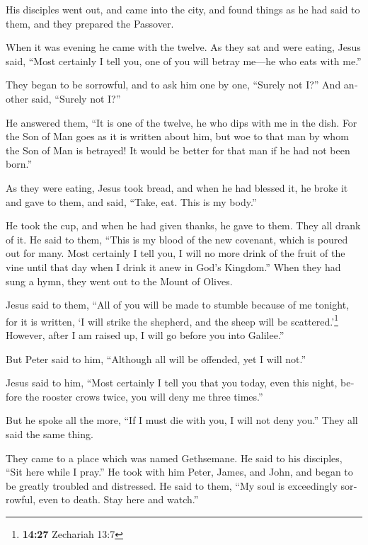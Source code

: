 \begin{paracol}{2}
\begin{otherlanguage}{english}
 His disciples went out, and came into the city, and
found things as he had said to them, and they prepared the Passover.

 When it was evening he came with the twelve.
 As they sat and were eating, Jesus said, ``Most
certainly I tell you, one of you will betray me---he who eats with me.''

 They began to be sorrowful, and to ask him one by one,
``Surely not I?'' And another said, ``Surely not I?''

 He answered them, ``It is one of the twelve, he who dips
with me in the dish.  For the Son of Man goes as it is
written about him, but woe to that man by whom the Son of Man is
betrayed! It would be better for that man if he had not been born.''

 As they were eating, Jesus took bread, and when he had
blessed it, he broke it and gave to them, and said, ``Take, eat. This is
my body.''

 He took the cup, and when he had given thanks, he gave
to them. They all drank of it.  He said to them, ``This
is my blood of the new covenant, which is poured out for many.
 Most certainly I tell you, I will no more drink of the
fruit of the vine until that day when I drink it anew in God's
Kingdom.''  When they had sung a hymn, they went out to
the Mount of Olives.

 Jesus said to them, ``All of you will be made to stumble
because of me tonight, for it is written, `I will strike the shepherd,
and the sheep will be scattered.'\footnote{\textbf{14:27} Zechariah 13:7}
 However, after I am raised up, I will go before you into
Galilee.''

 But Peter said to him, ``Although all will be offended,
yet I will not.''

 Jesus said to him, ``Most certainly I tell you that you
today, even this night, before the rooster crows twice, you will deny me
three times.''

 But he spoke all the more, ``If I must die with you, I
will not deny you.'' They all said the same thing.

 They came to a place which was named Gethsemane. He said
to his disciples, ``Sit here while I pray.''  He took
with him Peter, James, and John, and began to be greatly troubled and
distressed.  He said to them, ``My soul is exceedingly
sorrowful, even to death. Stay here and watch.''


\end{otherlanguage}
\end{paracol}
